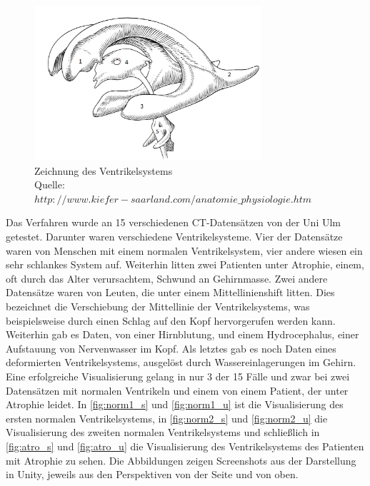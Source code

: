 \begin{figure}[!h] 
\centering 
\includegraphics[width=0.75\textwidth]{Logos/Ventrikelsystem_V2.png}
\caption{Zeichnung des Ventrikelsystems  \\  Quelle:$ http://www.kiefer-saarland.com/anatomie\_physiologie.htm$} 
\label{fig:ventrik} 
\end{figure}


Das Verfahren wurde an 15 verschiedenen CT-Datensätzen von der Uni Ulm getestet. Darunter waren verschiedene Ventrikelsysteme. Vier der Datensätze waren von Menschen mit einem normalen Ventrikelsystem, vier andere wiesen ein sehr schlankes System auf. Weiterhin litten zwei Patienten unter Atrophie, einem, oft durch das Alter verursachtem, Schwund an Gehirnmasse. Zwei andere Datensätze waren von Leuten, die unter einem Mittellinienshift litten. Dies bezeichnet die Verschiebung der Mittellinie der Ventrikelsystems, was beispielsweise durch einen Schlag auf den Kopf hervorgerufen werden kann. Weiterhin gab es Daten, von einer Hirnblutung, und einem Hydrocephalus, einer Aufstauung von Nervenwasser im Kopf. Als letztes gab es noch Daten eines deformierten Ventrikelsystems, ausgelöst durch Wassereinlagerungen im Gehirn.
\newline
Eine erfolgreiche Visualisierung gelang in nur 3 der 15 Fälle und zwar bei zwei Datensätzen mit normalen Ventrikeln und einem von einem Patient, der unter Atrophie leidet. In \autoref{fig:norm1_s} und \autoref{fig:norm1_u} ist die Visualisierung des ersten normalen Ventrikelsystems, in \autoref{fig:norm2_s} und \autoref{fig:norm2_u} die Visualisierung des zweiten normalen Ventrikelsystems und schließlich in \autoref{fig:atro_s} und \autoref{fig:atro_u} die Visualisierung des Ventrikelsystems des Patienten mit Atrophie zu sehen. Die Abbildungen zeigen Screenshots aus der Darstellung in Unity, jeweils aus den Perspektiven von der Seite und von oben.


